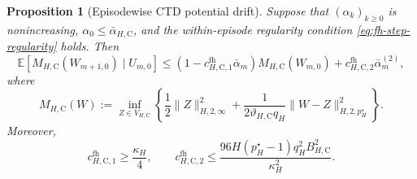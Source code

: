 \documentclass{article}
\newtheorem{proposition}[theorem]{Proposition}
\begin{document}
\begin{proposition}[Episodewise CTD potential drift]
\label{prop:fh-ctd-drift}
Suppose that $(\alpha_k)_{k\ge0}$ is nonincreasing, $\alpha_0\le\bar\alpha_{H,\mathrm C}$, and the within-episode regularity condition \eqref{eq:fh-step-regularity} holds. Then
\begin{equation}
\mathbb E\left[M_{H,\mathrm C}(W_{m+1,0})\mid U_{m,0}\right]\le\left(1-c_{H,\mathrm C,1}^{\mathrm{fh}}\bar\alpha_m\right)M_{H,\mathrm C}(W_{m,0})+c_{H,\mathrm C,2}^{\mathrm{fh}}\bar\alpha_m^{(2)},
\end{equation}
where
\begin{equation}
M_{H,\mathrm C}(W):=\inf_{Z\in V_{H,\mathrm C}}\left\{\frac{1}{2}\lVert Z\rVert_{H,2,\infty}^2+\frac{1}{2\vartheta_{H,\mathrm C}q_H}\lVert W-Z\rVert_{H,2,p_H^\star}^2\right\}.
\end{equation}
Moreover,
\begin{equation}
c_{H,\mathrm C,1}^{\mathrm{fh}}\ge\frac{\kappa_H}{4},\qquad c_{H,\mathrm C,2}^{\mathrm{fh}}\le\frac{96H(p_H^\star-1)q_H^2B_{H,\mathrm C}^2}{\kappa_H^2}.
\end{equation}
\end{proposition}
\end{document}
